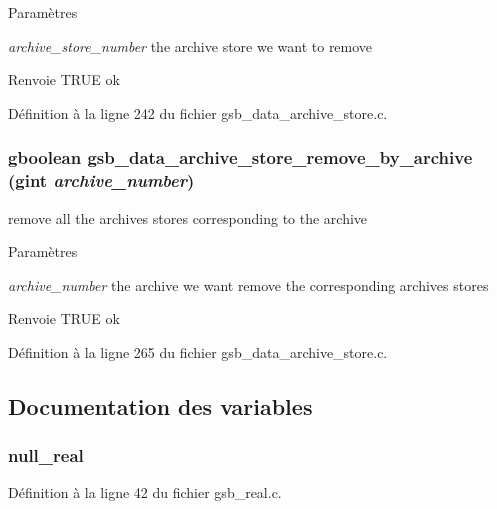 \begin{DoxyParams}{Paramètres}
\item[{\em archive\_\-store\_\-number}]the archive store we want to remove\end{DoxyParams}
\begin{DoxyReturn}{Renvoie}
TRUE ok 
\end{DoxyReturn}


Définition à la ligne 242 du fichier gsb\_\-data\_\-archive\_\-store.c.

\subsubsection[{gsb\_\-data\_\-archive\_\-store\_\-remove\_\-by\_\-archive}]{\setlength{\rightskip}{0pt plus 5cm}gboolean gsb\_\-data\_\-archive\_\-store\_\-remove\_\-by\_\-archive (gint {\em archive\_\-number})}\label{gsb__data__archive__store_8c_a27c1f783d9b3538226a3dd233af1a154}
remove all the archives stores corresponding to the archive


\begin{DoxyParams}{Paramètres}
\item[{\em archive\_\-number}]the archive we want remove the corresponding archives stores\end{DoxyParams}
\begin{DoxyReturn}{Renvoie}
TRUE ok 
\end{DoxyReturn}


Définition à la ligne 265 du fichier gsb\_\-data\_\-archive\_\-store.c.



\subsection{Documentation des variables}
\subsubsection[{null\_\-real}]{ {\bf null\_\-real}}\label{gsb__data__archive__store_8c_a26f304bec3fdc0651b9aa8765d4de3c6}


Définition à la ligne 42 du fichier gsb\_\-real.c.

